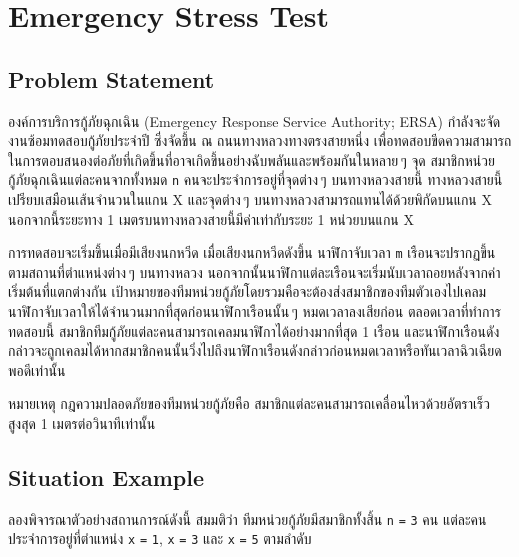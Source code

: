 \section{Emergency Stress Test}

\subsection{Problem Statement}

องค์การบริการกู้ภัยฉุกเฉิน (Emergency Response Service Authority; ERSA) กำลังจะจัดงานซ้อมทดสอบกู้ภัยประจำปี ซึ่งจัดขึ้น ณ ถนนทางหลวงทางตรงสายหนึ่ง เพื่อทดสอบขีดความสามารถในการตอบสนองต่อภัยที่เกิดขึ้นที่อาจเกิดขึ้นอย่างฉับพลันและพร้อมกันในหลาย\,ๆ จุด \;
สมาชิกหน่วยกู้ภัยฉุกเฉินแต่ละคนจากทั้งหมด \lstinline{n} คนจะประจำการอยู่ที่จุดต่าง\,ๆ บนทางหลวงสายนี้ \;
ทางหลวงสายนี้เปรียบเสมือนเส้นจำนวนในแกน X และจุดต่าง\,ๆ บนทางหลวงสามารถแทนได้ด้วยพิกัดบนแกน X \;
นอกจากนี้ระยะทาง 1 เมตรบนทางหลวงสายนี้มีค่าเท่ากับระยะ 1 หน่วยบนแกน X

การทดสอบจะเริ่มขึ้นเมื่อมีเสียงนกหวีด \;\;
เมื่อเสียงนกหวีดดังขึ้น นาฬิกาจับเวลา \lstinline{m} เรือนจะปรากฏขึ้นตามสถานที่ตำแหน่งต่าง\,ๆ บนทางหลวง \;
นอกจากนั้นนาฬิกาแต่ละเรือนจะเริ่มนับเวลาถอยหลังจากค่าเริ่มต้นที่แตกต่างกัน \;
เป้าหมายของทีมหน่วยกู้ภัยโดยรวมคือจะต้องส่งสมาชิกของทีมตัวเองไปเคลมนาฬิกาจับเวลาให้ได้จำนวนมากที่สุดก่อนนาฬิกาเรือนนั้น\,ๆ หมดเวลาลงเสียก่อน \;
ตลอดเวลาที่ทำการทดสอบนี้ สมาชิกทีมกู้ภัยแต่ละคนสามารถเคลมนาฬิกาได้อย่างมากที่สุด 1 เรือน และนาฬิกาเรือนดังกล่าวจะถูกเคลมได้หากสมาชิกคนนั้นวิ่งไปถึงนาฬิกาเรือนดังกล่าวก่อนหมดเวลาหรือทันเวลาฉิวเฉียดพอดีเท่านั้น

หมายเหตุ กฎความปลอดภัยของทีมหน่วยกู้ภัยคือ สมาชิกแต่ละคนสามารถเคลื่อนไหวด้วยอัตราเร็วสูงสุด 1 เมตรต่อวินาทีเท่านั้น


\subsection{Situation Example}

ลองพิจารณาตัวอย่างสถานการณ์ดังนี้ \;
สมมติว่า ทีมหน่วยกู้ภัยมีสมาชิกทั้งสิ้น 
\lstinline{n} \lstinline{=} \lstinline{3} คน 
แต่ละคนประจำการอยู่ที่ตำแหน่ง
\lstinline{x} \lstinline{=} \lstinline{1}, 
\lstinline{x} \lstinline{=} \lstinline{3} 
และ \lstinline{x} \lstinline{=} \lstinline{5} ตามลำดับ

